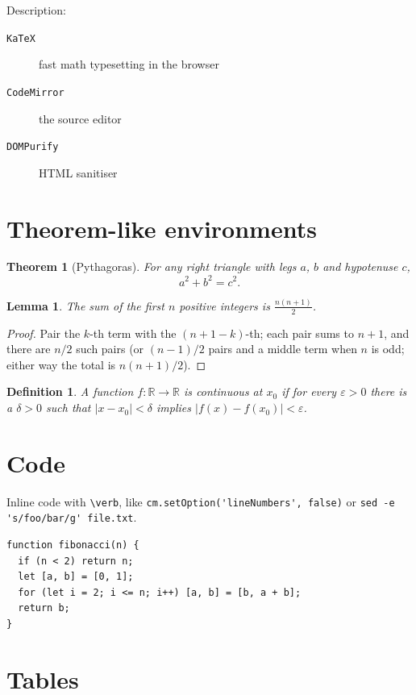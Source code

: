 \documentclass{article}
\newtheorem{theorem}{Theorem}
\newtheorem{lemma}{Lemma}
\newtheorem{definition}{Definition}
\begin{document}
Description:
\begin{description}
  \item[\texttt{KaTeX}] fast math typesetting in the browser
  \item[\texttt{CodeMirror}] the source editor
  \item[\texttt{DOMPurify}] HTML sanitiser
\end{description}

\section{Theorem-like environments}

\begin{theorem}[Pythagoras]
For any right triangle with legs $a$, $b$ and hypotenuse $c$,
\[ a^2 + b^2 = c^2. \]
\end{theorem}

\begin{lemma}
The sum of the first $n$ positive integers is
$\tfrac{n(n+1)}{2}$.
\end{lemma}

\begin{proof}
Pair the $k$-th term with the $(n+1-k)$-th; each pair sums to $n+1$,
and there are $n/2$ such pairs (or $(n-1)/2$ pairs and a middle term
when $n$ is odd; either way the total is $n(n+1)/2$).
\end{proof}

\begin{definition}
A function $f \colon \mathbb{R} \to \mathbb{R}$ is
\emph{continuous at $x_0$} if for every $\varepsilon > 0$ there is a
$\delta > 0$ such that $|x - x_0| < \delta$ implies
$|f(x) - f(x_0)| < \varepsilon$.
\end{definition}

\section{Code}

Inline code with \verb|\verb|, like
\verb|cm.setOption('lineNumbers', false)| or
\verb!sed -e 's/foo/bar/g' file.txt!.

\begin{verbatim}
function fibonacci(n) {
  if (n < 2) return n;
  let [a, b] = [0, 1];
  for (let i = 2; i <= n; i++) [a, b] = [b, a + b];
  return b;
}
\end{verbatim}

\section{Tables}
\end{document}
